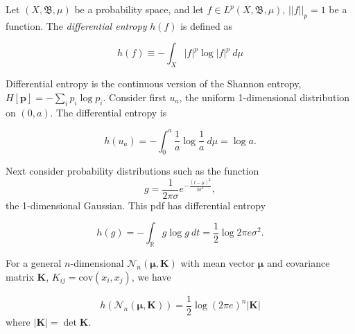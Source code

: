 \documentclass[12pt]{article}
\newcommand{\mv}[1]{\mathbf{#1}}	%
\newcommand{\cov}{\mathrm{cov}}
\begin{document}
Let $(X, \mathfrak{B}, \mu)$ be a probability space, and let $f \in L^p(X, \mathfrak{B}, \mu)$, $||f||_{p} = 1$ be a function.  The \emph{differential entropy} $h(f)$ is defined as

\begin{equation}
h(f) \equiv -\int_{X} |f|^p \log |f|^p\ d\mu
\end{equation}

Differential entropy is the continuous version of the Shannon entropy, $H[\mv{p}] = -\sum_{i} p_i \log p_i$.  Consider first $u_a$, the uniform 1-dimensional distribution on $(0,a)$.  The differential entropy is

\begin{equation}
h(u_a) = -\int_{0}^{a} \frac{1}{a} \log \frac{1}{a}\ d\mu = \log a.
\end{equation}

Next consider probability distributions such as the function
\begin{equation}
g = \frac{1}{2 \pi \sigma}e^{-\frac{(t-\mu)^2}{2 \sigma^2}},
\end{equation}
the 1-dimensional Gaussian.  This pdf has differential entropy

\begin{equation}
h(g) = -\int_{\mathbb{R}} g \log g\ dt = \frac{1}{2} \log 2 \pi e \sigma^2.
\end{equation}

For a general $n$-dimensional     $\mathcal{N}_{n}(\mv{\mu},\mv{K})$ with mean vector $\mv{\mu}$ and covariance matrix $\mv{K}$, $K_{ij} = \cov(x_i, x_j)$, we have

\begin{equation}
h(\mathcal{N}_{n}(\mv{\mu},\mv{K})) = \frac{1}{2} \log (2 \pi e)^n |\mv{K}|
\end{equation}
where $|\mv{K}| = \det{\mv{K}}$.
\end{document}
